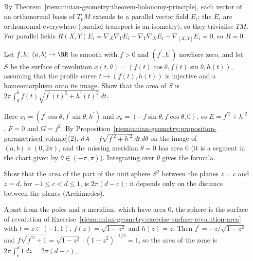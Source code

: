 \begin{solution}
By Theorem~\ref{riemannian-geometry:theorem-holonomy-principle}, each vector of an orthonormal basis of $T_pM$ extends to a parallel vector field $E_i$; the $E_i$ are orthonormal everywhere (parallel transport is an isometry), so they
trivialise $TM$. For parallel fields $R(X, Y)E_i = \nabla_X\nabla_YE_i - \nabla_Y\nabla_XE_i - \nabla_{[X,Y]}E_i = 0$, so $R = 0$.
\end{solution}

\begin{exercise}\label{riemannian-geometry:exercise-surface-revolution-area}
Let $f, h \colon (a, b) \to \RR$ be smooth with $f > 0$ and $(f^{\prime}, h^{\prime})$ nowhere zero, and let $S$ be the surface of revolution
$x(t, \theta) = (f(t)\cos\theta, f(t)\sin\theta, h(t))$, assuming that the profile curve $t \mapsto (f(t), h(t))$ is injective and a homeomorphism onto its image. Show that the area of $S$ is $2\pi\int_a^bf(t)\sqrt{f^{\prime}(t)^2 + h^{\prime}(t)^2}\,dt$.
\end{exercise}

\begin{solution}
Here $x_t = (f^{\prime}\cos\theta, f^{\prime}\sin\theta, h^{\prime})$ and $x_\theta = (-f\sin\theta, f\cos\theta, 0)$, so $E = f^{\prime 2} + h^{\prime 2}$, $F = 0$ and $G = f^2$.
By Proposition~\ref{riemannian-geometry:proposition-parametrised-volume}(2), $dA = f\sqrt{f^{\prime 2} + h^{\prime 2}}\,dt\,d\theta$ on the image of
$(a, b) \times (0, 2\pi)$, and the missing meridian $\theta = 0$ has area $0$ (it is a segment in the chart given by $\theta \in (-\pi, \pi)$). Integrating over $\theta$
gives the formula.
\end{solution}

\begin{exercise}\label{riemannian-geometry:exercise-archimedes}
Show that the area of the part of the unit sphere $S^2$ between the planes $z = c$ and $z = d$, for $-1 \leq c < d \leq 1$, is $2\pi(d - c)$: it depends only on the
distance between the planes (Archimedes).
\end{exercise}

\begin{solution}
Apart from the poles and a meridian, which have area $0$, the sphere is the surface of revolution of Exercise~\ref{riemannian-geometry:exercise-surface-revolution-area}
with $t = z \in (-1, 1)$, $f(z) = \sqrt{1 - z^2}$ and $h(z) = z$. Then $f^{\prime} = -z/\sqrt{1 - z^2}$ and $f\sqrt{f^{\prime 2} + 1} = \sqrt{1 - z^2} \cdot (1 - z^2)^{-1/2} = 1$, so
the area of the zone is $2\pi\int_c^d1\,dz = 2\pi(d - c)$.
\end{solution}

